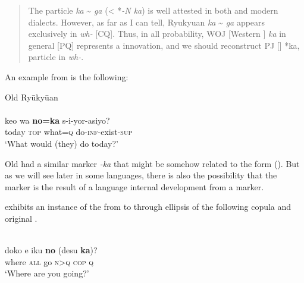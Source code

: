 \begin{quote}
The  particle \textit{ka} {\textasciitilde} \textit{ga} (< *\textit{-N ka}) is well attested in both  and modern dialects. However, as far as I can tell, Ryukyuan \textit{ka} {\textasciitilde} \textit{ga} appears exclusively in \textit{wh-} [CQ]. Thus, in all probability, WOJ [Western ] \textit{ka} in general  [PQ] represents a  innovation, and we should reconstruct PJ [] *ka,  particle in \textit{wh-}.
\end{quote}

\noindent An example from  is the following:

\ea%
    \label{ex:japa:7}
    Old Ryūkyūan\\
    \\
    \gll keo  wa \textbf{{no=ka}} s-i-yor-asiyo?\\
    today  \textsc{top}  what=\textsc{q}  do-\textsc{inf}-exist-\textsc{sup}\\
    \glt ‘What would (they) do today?’ \citep[1229]{Vovin2009}
    \z

Old  had a similar marker \textit{-ka}  that might be somehow related to the  form (). But as we will see later in some  languages, there is also the possibility that the marker is the result of a language internal development from a  marker.

 exhibits an instance of the  from  to  through ellipsis of the following copula and original .

\ea%
    \label{ex:japa:8}
   \\
    \gll doko  e  iku \textbf{{no}} (desu \textbf{{ka}})?\\
    where  \textsc{all}  go  \textsc{n}>\textsc{q}  \textsc{cop}  \textsc{q}\\
    \glt ‘Where are you going?’ \citep[163]{Hinds1984}
    \z

